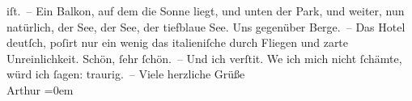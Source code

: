 \begin{ledgroupsized}[t]{13cm}
               iſt. – Ein Balkon, auf dem die Sonne liegt, und unten der Park, und weiter, nun
               natürlich, der See, der See,
               der tiefblaue See. Uns
               gegenüber Berge. – Das Hotel deutſch, poſirt nur ein wenig das italieniſche durch Fliegen und zarte Unreinlichkeit. Schön, ſehr
               ſchön. – Und ich verſti{\geminationm}t. We{\geminationn} ich mich nicht ſchämte, würd ich ſagen: traurig. –\pend
           \pstart
           Viele herzliche Grüße{\\[\baselineskip]}\spacefill\mbox{Arthur}\pend
           \leftskip=0em{}
         
         \endnumbering{}\end{ledgroupsized}  \newcommand{\dateiname}{L00123}\newcommand{\titel}{Arthur Schnitzler an Richard Beer-Hofmann, 13. 9. 1892}\newcommand{\editorInnen}{Martin Anton Müller und Gerd-Hermann Susen}
      